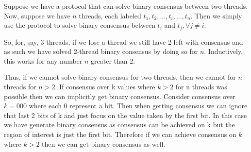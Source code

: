 \documentclass[11pt,letterpaper]{exam}
\begin{document}
\begin{questions}
		
		\question
			Suppose we have a protocol that can solve binary consensus between two threads.
			Now, suppose we have $n$ threads, each labeled $t_1, t_2, ..., t_i, ..., t_n$.
			Then we simply use the protocol to solve binary consensus between $t_i$ and $t_j, \forall j \neq i$.
			
			So, for, say, 3 threads, if we lose a thread we still have 2 left with consensus and as such we have solved 2-thread binary consensus by doing so for $n$.
			Inductively, this works for any number $n$ greater than 2.
			
			Thus, if we cannot solve binary consensus for two threads, then we cannot for $n$ threads for $n>2$.
		\question
			If consensus over k values where $k>2$ for n threads was possible then we can implicitly get binary consensus. Consider consensus over $k=000$ where each 0 represent a bit. Then when getting consensus we can ignore that last 2 bits of k and just focus on the value taken by the first bit. In this case we have generate binary consensus as consensus can be achieved on k but the region of interest is just the first bit. Therefore if we can achieve consensus on $k$ where $k>2$ then we can get binary consensus as well.
	\end{questions}
	
\end{document}
